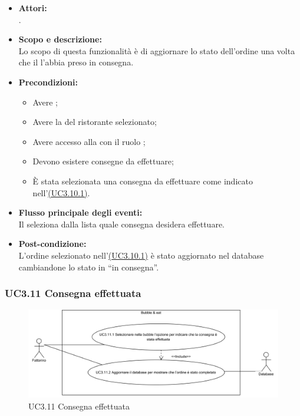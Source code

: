 \begin{itemize}
	\item \textbf{Attori:}
	\\.
	\item \textbf{Scopo e descrizione:} 
	\\Lo scopo di questa funzionalità è di aggiornare lo stato dell'ordine una volta che il  l'abbia preso in consegna.
	\item \textbf{Precondizioni:}
	\begin{itemize}
		\item Avere ;
		\item Avere la  del ristorante selezionato;
		\item Avere accesso alla  con il ruolo ;
		\item Devono esistere consegne da effettuare;
		\item È stata selezionata una consegna da effettuare come indicato nell’\hyperref[UC3.10.1]{(UC3.10.1)}.
	\end{itemize}
	\item \textbf{Flusso principale degli eventi:}
	\\Il {} seleziona dalla lista quale consegna desidera effettuare.
	\item \textbf{Post-condizione:}
	\\L'ordine selezionato nell’\hyperref[UC3.10.1]{(UC3.10.1)} è stato aggiornato nel database cambiandone lo stato in “in consegna”.
\end{itemize}

\subsubsection{UC3.11 Consegna effettuata} \label{UC3.11}

\begin{figure}[H]
	\centering
	\includegraphics[width=15cm]{../../documenti/AnalisiDeiRequisiti/Diagrammi_img/uc3_11.png}
	\caption{UC3.11 Consegna effettuata}
\end{figure}

